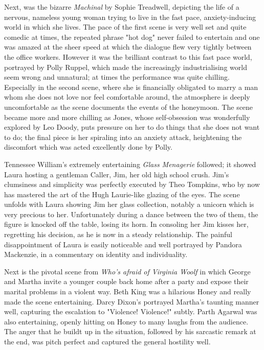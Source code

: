 Next, was the bizarre \textit{Machinal} by Sophie Treadwell, depicting the
life of a nervous, nameless young woman trying to live in the fast pace,
anxiety-inducing world in which she lives. The pace of the first scene
is very well set and quite comedic at times, the repeated phrase "hot
dog" never failed to entertain and one was amazed at the sheer speed at
which the dialogue flew very tightly between the office workers. However
it was the brilliant contrast to this fast pace world, portrayed by
Polly Ruppel, which made the increasingly industrialising world seem
wrong and unnatural; at times the performance was quite chilling.
Especially in the second scene, where she is financially obligated to
marry a man whom she does not love nor feel comfortable around, the
atmosphere is deeply uncomfortable as the scene documents the events of
the honeymoon. The scene became more and more chilling as Jones, whose
self-obsession was wonderfully explored by Leo Doody, puts pressure on
her to do things that she does not want to do; the final piece is her
spiraling into an anxiety attack, heightening the discomfort which was
acted excellently done by Polly.

Tennessee William's extremely entertaining \textit{Glass Menagerie}
followed; it showed Laura hosting a gentleman Caller, Jim, her old high
school crush. Jim's clumsiness and simplicity was perfectly executed by
Theo Tompkins, who by now has mastered the art of the Hugh Laurie-like
glazing of the eyes. The scene unfolds with Laura showing Jim her glass
collection, notably a unicorn which is very precious to her.
Unfortunately during a dance between the two of them, the figure is
knocked off the table, losing its horn. In consoling her Jim kisses her,
regretting his decision, as he is now in a steady relationship. The
painful disappointment of Laura is easily noticeable and well portrayed
by Pandora Mackenzie, in a commentary on identity and individuality.

Next is the pivotal scene from \textit{Who's afraid of Virginia Woolf} in
which George and Martha invite a younger couple back home after a party
and expose their marital problems in a violent way. Beth King was a
hilarious Honey and really made the scene entertaining. Darcy Dixon's
portrayed Martha's taunting manner well, capturing the escalation to
"Violence! Violence!" subtly. Parth Agarwal was also entertaining,
openly hitting on Honey to many laughs from the audience. The anger that
he buildt up in the situation, followed by his sarcastic remark at the
end, was pitch perfect and captured the general hostility well.

